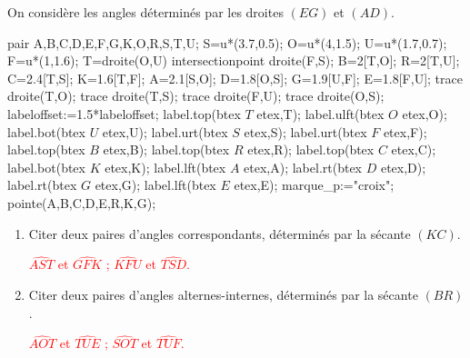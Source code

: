 \begin{corrige}
    On considère les angles déterminés par les droites $(EG)$ et $(AD)$.
\begin{center}
    \begin{Geometrie}[CoinBG={(-0.5u,-0.5u)},CoinHD={(6u,3u)}]
        pair A,B,C,D,E,F,G,K,O,R,S,T,U;
        S=u*(3.7,0.5);
        O=u*(4,1.5);
        U=u*(1.7,0.7);
        F=u*(1,1.6);
        T=droite(O,U) intersectionpoint droite(F,S);
        B=2[T,O];
        R=2[T,U];
        C=2.4[T,S];
        K=1.6[T,F];
        A=2.1[S,O];
        D=1.8[O,S];
        G=1.9[U,F];
        E=1.8[F,U];
        trace droite(T,O);
        trace droite(T,S);        
        trace droite(F,U);
        trace droite(O,S);
        labeloffset:=1.5*labeloffset;
        label.top(btex $T$ etex,T);
        label.ulft(btex $O$ etex,O);
        label.bot(btex $U$ etex,U);
        label.urt(btex $S$ etex,S);
        label.urt(btex $F$ etex,F);
        label.top(btex $B$ etex,B);
        label.top(btex $R$ etex,R);
        label.top(btex $C$ etex,C);
        label.bot(btex $K$ etex,K);
        label.lft(btex $A$ etex,A);
        label.rt(btex $D$ etex,D);
        label.rt(btex $G$ etex,G);
        label.lft(btex $E$ etex,E);
        marque_p:="croix";
        pointe(A,B,C,D,E,R,K,G);
    \end{Geometrie}
\end{center}
\begin{enumerate}
    \item Citer deux paires d'angles correspondants, déterminés par la sécante $(KC)$.
    \par\textcolor{red}{$\widehat{AST}$ et $\widehat{GFK}$ ; $\widehat{KFU}$ et $\widehat{TSD}$.}
    \item Citer deux paires d'angles alternes-internes, déterminés par la sécante $(BR)$.
    \par\textcolor{red}{$\widehat{AOT}$ et $\widehat{TUE}$ ; $\widehat{SOT}$ et $\widehat{TUF}$.}
\end{enumerate}
\end{corrige}